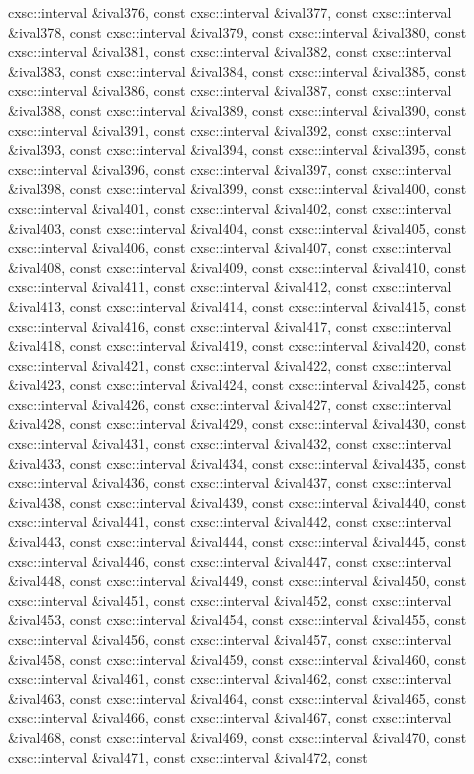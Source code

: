 \begin{DoxyCompactItemize}
cxsc\-::interval \&ival376, const cxsc\-::interval \&ival377, const cxsc\-::interval \&ival378, const cxsc\-::interval \&ival379, const cxsc\-::interval \&ival380, const cxsc\-::interval \&ival381, const cxsc\-::interval \&ival382, const cxsc\-::interval \&ival383, const cxsc\-::interval \&ival384, const cxsc\-::interval \&ival385, const cxsc\-::interval \&ival386, const cxsc\-::interval \&ival387, const cxsc\-::interval \&ival388, const cxsc\-::interval \&ival389, const cxsc\-::interval \&ival390, const cxsc\-::interval \&ival391, const cxsc\-::interval \&ival392, const cxsc\-::interval \&ival393, const cxsc\-::interval \&ival394, const cxsc\-::interval \&ival395, const cxsc\-::interval \&ival396, const cxsc\-::interval \&ival397, const cxsc\-::interval \&ival398, const cxsc\-::interval \&ival399, const cxsc\-::interval \&ival400, const cxsc\-::interval \&ival401, const cxsc\-::interval \&ival402, const cxsc\-::interval \&ival403, const cxsc\-::interval \&ival404, const cxsc\-::interval \&ival405, const cxsc\-::interval \&ival406, const cxsc\-::interval \&ival407, const cxsc\-::interval \&ival408, const cxsc\-::interval \&ival409, const cxsc\-::interval \&ival410, const cxsc\-::interval \&ival411, const cxsc\-::interval \&ival412, const cxsc\-::interval \&ival413, const cxsc\-::interval \&ival414, const cxsc\-::interval \&ival415, const cxsc\-::interval \&ival416, const cxsc\-::interval \&ival417, const cxsc\-::interval \&ival418, const cxsc\-::interval \&ival419, const cxsc\-::interval \&ival420, const cxsc\-::interval \&ival421, const cxsc\-::interval \&ival422, const cxsc\-::interval \&ival423, const cxsc\-::interval \&ival424, const cxsc\-::interval \&ival425, const cxsc\-::interval \&ival426, const cxsc\-::interval \&ival427, const cxsc\-::interval \&ival428, const cxsc\-::interval \&ival429, const cxsc\-::interval \&ival430, const cxsc\-::interval \&ival431, const cxsc\-::interval \&ival432, const cxsc\-::interval \&ival433, const cxsc\-::interval \&ival434, const cxsc\-::interval \&ival435, const cxsc\-::interval \&ival436, const cxsc\-::interval \&ival437, const cxsc\-::interval \&ival438, const cxsc\-::interval \&ival439, const cxsc\-::interval \&ival440, const cxsc\-::interval \&ival441, const cxsc\-::interval \&ival442, const cxsc\-::interval \&ival443, const cxsc\-::interval \&ival444, const cxsc\-::interval \&ival445, const cxsc\-::interval \&ival446, const cxsc\-::interval \&ival447, const cxsc\-::interval \&ival448, const cxsc\-::interval \&ival449, const cxsc\-::interval \&ival450, const cxsc\-::interval \&ival451, const cxsc\-::interval \&ival452, const cxsc\-::interval \&ival453, const cxsc\-::interval \&ival454, const cxsc\-::interval \&ival455, const cxsc\-::interval \&ival456, const cxsc\-::interval \&ival457, const cxsc\-::interval \&ival458, const cxsc\-::interval \&ival459, const cxsc\-::interval \&ival460, const cxsc\-::interval \&ival461, const cxsc\-::interval \&ival462, const cxsc\-::interval \&ival463, const cxsc\-::interval \&ival464, const cxsc\-::interval \&ival465, const cxsc\-::interval \&ival466, const cxsc\-::interval \&ival467, const cxsc\-::interval \&ival468, const cxsc\-::interval \&ival469, const cxsc\-::interval \&ival470, const cxsc\-::interval \&ival471, const cxsc\-::interval \&ival472, const 
\end{DoxyCompactItemize}
